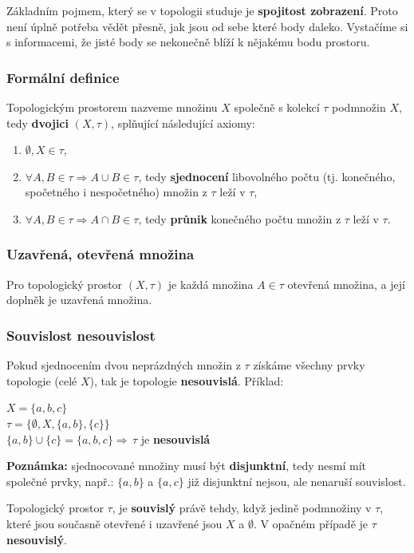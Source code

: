 Základním pojmem, který se v topologii studuje je \textbf{spojitost zobrazení}. Proto není úplně potřeba vědět přesně, jak jsou od sebe které body daleko. Vystačíme si s informacemi, že jisté body se nekonečně blíží k nějakému bodu prostoru.

\subsubsection{Formální definice}
Topologickým prostorem nazveme množinu $X$ společně s kolekcí $\tau$ podmnožin $X$, tedy \textbf{dvojici} $(X, \tau)$, splňující následující axiomy:
\begin{enumerate}
\item $\emptyset, X \in \tau$,
\item $\forall A, B \in \tau \Rightarrow  A \cup B \in \tau $, tedy \textbf{sjednocení} libovolného počtu (tj. konečného, spočetného i nespočetného) množin z $\tau$ leží v $\tau$,
\item $\forall A, B \in \tau \Rightarrow A \cap B \in \tau $, tedy \textbf{průnik} konečného počtu množin z $\tau$ leží v $\tau$.
\end{enumerate}

\subsubsection{Uzavřená, otevřená množina}
Pro topologický prostor $(X, \tau)$ je každá množina $A \in \tau$ otevřená množina, a její doplněk je uzavřená množina.

\subsubsection{Souvislost nesouvislost}
Pokud sjednocením dvou neprázdných množin z $\tau$ získáme všechny prvky topologie (celé $ X $), tak je topologie \textbf{nesouvislá}. Příklad:

\begin{center}
\begin{minipage}[t]{0.50\textwidth}
	$X = \{a, b, c\}$\\
	$\tau = \{\emptyset, X, \{a, b\}, \{c\}\}$\\
	$\{a, b\} \cup \{c\}  = \{a, b, c\} \Rightarrow \, \tau$ je \textbf{nesouvislá}
\end{minipage}
\begin{minipage}[t]{0.40\textwidth}
	\textbf{Poznámka:} sjednocované množiny musí být \textbf{disjunktní}, tedy nesmí mít společné prvky, např.: $\{a, b\}$ a $\{a, c\}$ již disjunktní nejsou, ale nenaruší souvislost.
\end{minipage}
\end{center}
\smallskip
Topologický prostor $ \tau $, je \textbf{souvislý} právě tehdy, když jedině podmnožiny v $\tau$, které jsou současně otevřené i uzavřené jsou $X$ a $\emptyset$. V opačném případě je $\tau$ \textbf{nesouvislý}.

